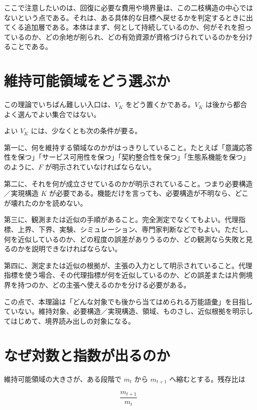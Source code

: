 \documentclass[12pt,a4paper]{article}
\begin{document}
ここで注意したいのは、回復に必要な費用や境界量は、この二枝構造の中心ではないという点である。それは、ある具体的な目標へ戻せるかを判定するときに出てくる追加層である。本体はまず、何として持続しているのか、何がそれを担っているのか、どの余地が削られ、どの有効資源が資格づけられているのかを分けることである。

\section{維持可能領域をどう選ぶか}\label{ux7dadux6301ux53efux80fdux9818ux57dfux3092ux3069ux3046ux9078ux3076ux304b}

この理論でいちばん難しい入口は、\(V_K\) をどう置くかである。\(V_K\) は後から都合よく選んでよい集合ではない。

よい \(V_K\) には、少なくとも次の条件が要る。

第一に、何を維持する領域なのかがはっきりしていること。たとえば「意識応答性を保つ」「サービス可用性を保つ」「契約整合性を保つ」「生態系機能を保つ」のように、\(F\) が明示されていなければならない。

第二に、それを何が成立させているのかが明示されていること。つまり必要構造／実現構造 \(K\) が必要である。機能だけを言っても、必要構造が不明なら、どこが壊れたのかを読めない。

第三に、観測または近似の手順があること。完全測定でなくてもよい。代理指標、上界、下界、実験、シミュレーション、専門家判断などでもよい。ただし、何を近似しているのか、どの程度の誤差がありうるのか、どの観測なら失敗と見るのかを説明できなければならない。

第四に、測定または近似の根拠が、主張の入力として明示されていること。代理指標を使う場合、その代理指標が何を近似しているのか、どの誤差または片側境界を持つのか、どの主張へ使えるのかを分ける必要がある。

この点で、本理論は「どんな対象でも後から当てはめられる万能語彙」を目指していない。維持対象、必要構造／実現構造、領域、ものさし、近似根拠を明示してはじめて、境界読み出しの対象になる。

\section{なぜ対数と指数が出るのか}\label{ux306aux305cux5bfeux6570ux3068ux6307ux6570ux304cux51faux308bux306eux304b}

維持可能領域の大きさが、ある段階で \(m_t\) から \(m_{t+1}\) へ縮むとする。残存比は

\[
\frac{m_{t+1}}{m_t}
\]
\end{document}
